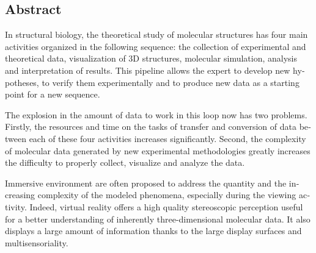 \begin{otherlanguage}{english}

%
  
\subsection*{Abstract}
  
\footnotesize

In structural biology, the theoretical study of molecular structures has four main activities organized in the following sequence: the collection of experimental and theoretical data, visualization of 3D structures, molecular simulation, analysis and interpretation of results. This pipeline allows the expert to develop new hypotheses, to verify them experimentally and to produce new data as a starting point for a new sequence.

The explosion in the amount of data to work in this loop now has two problems. Firstly, the resources and time on the tasks of transfer and conversion of data between each of these four activities increases significantly. Second, the complexity of molecular data generated by new experimental methodologies greatly increases the difficulty to properly collect, visualize and analyze the data.

Immersive environment are often proposed to address the quantity and the increasing complexity of the modeled phenomena, especially during the viewing activity. Indeed, virtual reality offers a high quality stereoscopic perception useful for a better understanding of inherently three-dimensional molecular data. It also displays a large amount of information thanks to the large display surfaces and multisensoriality.


\end{otherlanguage}
